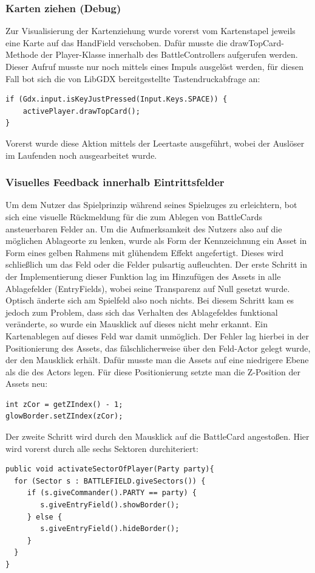\subsubsection{Karten ziehen (Debug)}
Zur Visualisierung der Kartenziehung wurde vorerst vom Kartenstapel jeweils eine Karte auf das HandField verschoben.
Dafür musste die drawTopCard-Methode der Player-Klasse innerhalb des BattleControllers aufgerufen werden.
Dieser Aufruf musste nur noch mittels eines Impuls ausgelöst werden, für diesen Fall bot sich die von LibGDX bereitgestellte Tastendruckabfrage an:
\begin{lstlisting}
if (Gdx.input.isKeyJustPressed(Input.Keys.SPACE)) {
	activePlayer.drawTopCard();
}
\end{lstlisting}
Vorerst wurde diese Aktion mittels der Leertaste ausgeführt, wobei der Auslöser im Laufenden noch ausgearbeitet wurde.

\subsubsection{Visuelles Feedback innerhalb Eintrittsfelder}
Um dem Nutzer das Spielprinzip während seines Spielzuges zu erleichtern, bot sich eine visuelle Rückmeldung für die zum Ablegen von BattleCards ansteuerbaren Felder an. Um die Aufmerksamkeit des Nutzers also auf die möglichen Ablageorte zu lenken, wurde als Form der Kennzeichnung ein Asset in Form eines gelben Rahmens mit glühendem Effekt angefertigt. Dieses wird schließlich um das Feld oder die Felder pulsartig aufleuchten.
Der erste Schritt in der Implementierung dieser Funktion lag im Hinzufügen des Assets in alle Ablagefelder (EntryFields), wobei seine Transparenz auf Null gesetzt wurde. Optisch änderte sich am Spielfeld also noch nichts.
Bei diesem Schritt kam es jedoch zum Problem, dass sich das Verhalten des Ablagefeldes funktional veränderte, so wurde ein Mausklick auf dieses nicht mehr erkannt. Ein Kartenablegen auf dieses Feld war damit unmöglich.
Der Fehler lag hierbei in der Positionierung des Assets, das fälschlicherweise über den Feld-Actor gelegt wurde, der den Mausklick erhält. Dafür musste man die Assets auf eine niedrigere Ebene als die des Actors legen. Für diese Positionierung setzte man die Z-Position der Assets neu:
\begin{lstlisting}
int zCor = getZIndex() - 1;
glowBorder.setZIndex(zCor);
\end{lstlisting}
Der zweite Schritt wird durch den Mausklick auf die BattleCard angestoßen. Hier wird vorerst durch alle sechs Sektoren durchiteriert:
\begin{lstlisting}
public void activateSectorOfPlayer(Party party){
  for (Sector s : BATTLEFIELD.giveSectors()) {
     if (s.giveCommander().PARTY == party) {
        s.giveEntryField().showBorder();
     } else {
        s.giveEntryField().hideBorder();
     }
  }
}
\end{lstlisting}

